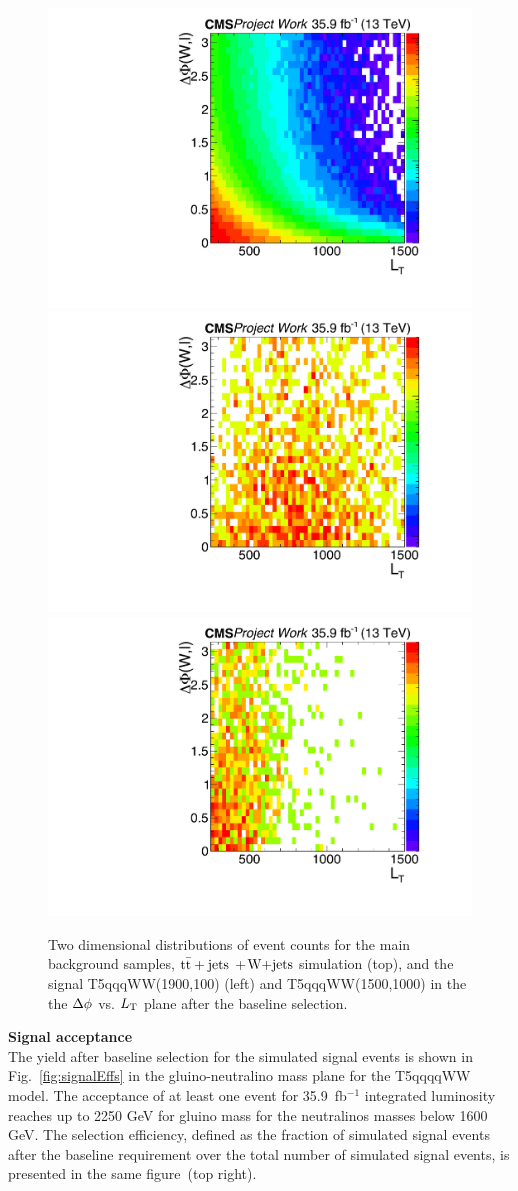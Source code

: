  \begin{figure}[!h]
    \begin{center}
 \includegraphics[width=0.45 \textwidth]{Plots/analysis/signalRegions/2D_TTWJets}\\
 \includegraphics[width=0.45 \textwidth]{Plots/analysis/signalRegions/2D_s1900_100}
 \includegraphics[width=0.45 \textwidth]{Plots/analysis/signalRegions/2D_s1500_1000}
  \caption{ \label{fig:2Ds} Two dimensional distributions of event counts for the main background samples, ${\rm t\bar{t}+jets}$ +$\textrm{W+jets}$ simulation (top), and the signal T5qqqWW(1900,100) (left) and T5qqqWW(1500,1000) in the the $\Delta \phi$ vs. $L_{\rm T}$ plane after the baseline selection.
  }
   \end{center}
\end{figure}
\textbf{Signal acceptance}\\
The yield after baseline selection for the simulated signal events is shown in Fig.~\ref{fig:signalEffs} in the gluino-neutralino mass plane for the T5qqqqWW model. The acceptance of at least one event for 35.9~fb$^{-1}$ integrated luminosity reaches up to 2250 GeV for gluino mass for the neutralinos masses below 1600 GeV. The selection efficiency, defined as the fraction of simulated signal events after the baseline requirement over the total number of simulated signal events, is presented in the same figure~(top right).
